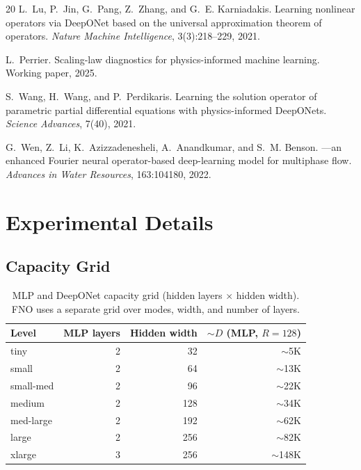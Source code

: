 \documentclass[11pt]{article}
\begin{document}
\begin{thebibliography}{20}
L.~Lu, P.~Jin, G.~Pang, Z.~Zhang, and G.~E. Karniadakis.
\newblock Learning nonlinear operators via {DeepONet} based on the universal
  approximation theorem of operators.
\newblock \emph{Nature Machine Intelligence}, 3(3):218--229, 2021.

L.~Perrier.
\newblock Scaling-law diagnostics for physics-informed machine learning.
\newblock Working paper, 2025.

S.~Wang, H.~Wang, and P.~Perdikaris.
\newblock Learning the solution operator of parametric partial differential
  equations with physics-informed {DeepONets}.
\newblock \emph{Science Advances}, 7(40), 2021.

G.~Wen, Z.~Li, K.~Azizzadenesheli, A.~Anandkumar, and S.~M. Benson.
---an enhanced {Fourier} neural operator-based deep-learning
  model for multiphase flow.
\newblock \emph{Advances in Water Resources}, 163:104180, 2022.

\end{thebibliography}

\appendix
\section{Experimental Details}
\label{app:details}

\subsection{Capacity Grid}

\begin{table}[h]
\centering
\caption{MLP and DeepONet capacity grid (hidden layers $\times$ hidden
width). FNO uses a separate grid over modes, width, and number of
layers.}
\label{tab:capacity-grid}
\begin{tabular}{@{}lrrr@{}}
\toprule
\textbf{Level} & \textbf{MLP layers} & \textbf{Hidden width} &
\textbf{$\sim D$ (MLP, $R\!=\!128$)} \\
\midrule
tiny      & 2 & 32  & $\sim$5K \\
small     & 2 & 64  & $\sim$13K \\
small-med & 2 & 96  & $\sim$22K \\
medium    & 2 & 128 & $\sim$34K \\
med-large & 2 & 192 & $\sim$62K \\
large     & 2 & 256 & $\sim$82K \\
xlarge    & 3 & 256 & $\sim$148K \\
\bottomrule
\end{tabular}
\end{table}
\end{document}
